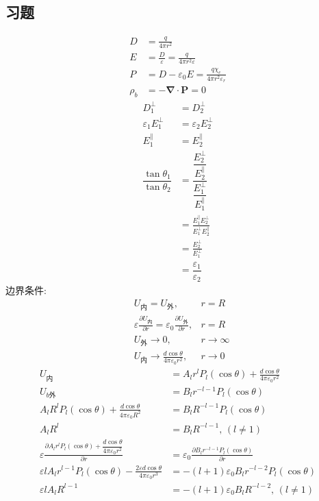 \subsection{习题}
\begin{align*}
    D&=\frac{q}{4\pi r^2}\\
    E&=\frac{D}{\varepsilon}=\frac{q}{4\pi r^2\varepsilon}\\
    P&=D-\varepsilon_0E=\frac{q\chi_e}{4\pi r^2\varepsilon_r}\\
    \rho_b&=-\boldsymbol{\nabla}\cdot\boldsymbol{P}=0
\end{align*}
\begin{align}
    D_{1}^\bot&=D_{2}^\bot\\
    \varepsilon_1E_1^\bot&=\varepsilon_2E_2^\bot\\
E_1^{\parallel}&=E_2^{\parallel}\\
\dfrac{\tan\theta_1}{\tan\theta_2}
&=\dfrac{\dfrac{E_2^\bot}{E_2^{\parallel}}}{\dfrac{E_1^\bot}{E_1^{\parallel}}}\\
&=\frac{E_1^{\parallel}E_2^\bot}{E_1^\bot E_2^{\parallel}}\\
&=\frac{E_2^\bot}{E_1^\bot}\\
&=\dfrac{\varepsilon_1}{\varepsilon_2}
\end{align}
边界条件:
\begin{align*}
    &U_{\text{内}}=U_{\text{外}},&r=R\\
    &\varepsilon\frac{\partial U_{\text{内}}}{\partial r}=\varepsilon_0\frac{\partial U_{\text{外}}}{\partial r},&r=R\\
    &U_\text{外}\to0,&r\to\infty\\
    &U_{\text{内}}\to\frac{d\cos\theta}{4\pi\varepsilon_0r^2},&r\to0
\end{align*}
\begin{align*}
U_{\text{内}}&=
A_l r^l
P_l(\cos\theta)
+\frac{d\cos\theta}{4\pi\varepsilon_0r^2}\\
U_{b\text{外}}&=
B_l r^{-l-1}
P_l(\cos\theta)\\
A_l R^l
P_l(\cos\theta)
+\frac{d\cos\theta}{4\pi\varepsilon_0R^2}&=
B_l R^{-l-1}
P_l(\cos\theta)\\
A_l R^l&=
B_l R^{-l-1},\,(l\neq1)\\
\varepsilon\frac{\partial A_l r^l
P_l(\cos\theta)
+\dfrac{d\cos\theta}{4\pi\varepsilon_0r^2}}{\partial r}&=\varepsilon_0\frac{\partial B_l r^{-l-1}
P_l(\cos\theta)}{\partial r}\\
\varepsilon lA_l r^{l-1}P_l(\cos\theta)
- \frac{2\varepsilon d\cos\theta}{4\pi\varepsilon_0r^3}&=-(l+1)\varepsilon_0B_l r^{-l-2}
P_l(\cos\theta)\\
\varepsilon lA_l R^{l-1}&=
-(l+1)\varepsilon_0B_l R^{-l-2},\,(l\neq1)
\end{align*}

